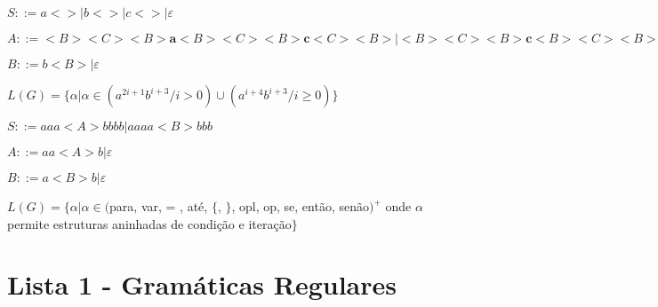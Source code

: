 \documentclass[ ]{article}
\begin{document}
%	
%	
	
	$S::= a<> | b<> | c<> | \varepsilon$
	
	$A::=<B><C><B>\textbf{a}<B><C><B>\textbf{c}<C><B> | <B><C><B>\textbf{c}<B><C><B>\textbf{a}<B><C><B> | \varepsilon | <B>$
	
	$B::= b<B> | \varepsilon$
	
	$L(G) = \{ \alpha | \alpha \in (a^{2i+1}b^{i+3} / i>0) \cup (a^{i+4}b^{i+3}/i\geq 0)\}$
	
	$S::= aaa<A>bbbb | aaaa<B>bbb$ %
	
	$A::= aa<A>b | \varepsilon$ %
	
	$B::= a<B>b | \varepsilon$ %
	
	$L(G) = \{ \alpha | \alpha \in ($para, var, = , até, $\{$, $\}$, opl, op, se, então, senão$)^+$ onde $\alpha$ permite estruturas aninhadas de condição e iteração$\}$ %
	
%
%
%


	
	
	\newpage

%
%	
%	
%	
%	
%	
%	
%	
%	
%	
%
%
%	
%	
%	
%	

	\section*{Lista 1 - Gramáticas Regulares}
	
\end{document}
